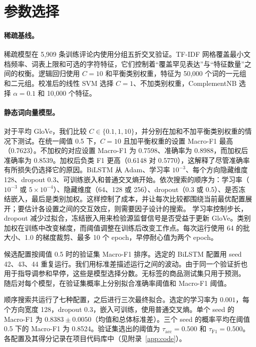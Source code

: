 \documentclass[11pt,a4paper]{article}
\begin{document}
\section{参数选择}\label{sec:hparams}

\paragraph{稀疏基线。}
稀疏模型在 5{,}909 条训练评论内使用分组五折交叉验证。TF-IDF 网格覆盖最小文档频率、词表上限和可选的字符特征，它们控制着``覆盖罕见表达''与``特征数量''之间的权衡。逻辑回归使用 $C=10$ 和平衡类别权重，特征为 50{,}000 个词的一元组和二元组。校准后的线性 SVM 选择 $C=1$、不加类别权重，ComplementNB 选择 $\alpha=0.1$ 和 10{,}000 个特征。

\paragraph{静态词向量模型。}
对于平均 GloVe，我们比较 $C\in\{0.1,1,10\}$，并分别在加和不加平衡类别权重的情况下测试。在统一阈值 0.5 下，$C=10$ 且加平衡权重的设置 Macro-F1 最高（0.7623）。不加权的对应设置 Macro-F1 为 0.7598、准确率为 0.8988，而加权后准确率为 0.8539。加权后负类 F1 更高（0.6148 对 0.5770），这解释了尽管准确率有所损失仍选择它的原因。BiLSTM 从 Adam、学习率 $10^{-3}$、每个方向隐藏维度 128、dropout 0.3、可训练嵌入和普通交叉熵开始。依次搜索的顺序为：学习率（$10^{-3}$ 或 $5\times10^{-4}$）、隐藏维度（64、128 或 256）、dropout（0.3 或 0.5）、是否冻结嵌入，最后是类别加权。这样控制了成本，并让每次比较都围绕当前最优配置展开；要估计各设置之间的交互效应，则需要因子设计的搜索。
学习率控制步长，dropout 减少过拟合，冻结嵌入用来检验源监督信号是否受益于更新 GloVe。类别加权在训练中改变梯度，而阈值调整在训练后改变工作点。每次运行使用 64 的批大小、1.0 的梯度裁剪、最多 10 个 epoch，早停耐心值为两个 epoch。

候选配置按阈值 0.5 时的验证集 Macro-F1 排序。选定的 BiLSTM 配置用 seed 42、43、44 重复运行。我们用标准差描述运行之间的波动。由于同一个验证折也用于指导调参和早停，这些是模型选择分数。无标签的商品测试集只用于预测。
随后对每个模型，在验证集概率上分别拟合准确率阈值和 Macro-F1 阈值。

顺序搜索共运行了七种配置，之后进行三次最终拟合。选定的学习率为 $0.001$，每个方向宽度 128，dropout 0.3，嵌入可训练，使用普通交叉熵。单个 seed 的 Macro-F1 为 $0.8383\pm0.0050$（均值和总体标准差）。三个 seed 的概率平均在阈值 0.5 下的 Macro-F1 为 0.8524。验证集选出的阈值为 $\tau_{\mathrm{acc}}=0.500$ 和 $\tau_{\mathrm{F1}}=0.500$。各配置及其得分记录在项目代码库中（见附录~\ref{app:code}）。
\end{document}
